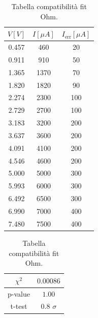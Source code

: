 \documentclass[letterpaper,12pt]{article}
\begin{document}
\begin{table}[h!]
    \begin{subtable}{0.5\textwidth}
        \centering
        \begin{tabular}{ccc}
            \toprule
            \rowcolor{blue!10}
            \textbf{$V[V]$} & \textbf{$I[\mu A]$} & \textbf{$I_{\text{err}}[\mu A]$} \\
            \midrule
            0.457 & 460 & 20 \\
            0.911 & 910 & 50 \\
            1.365 & 1370 & 70 \\
            1.820 & 1820 & 90 \\
            2.274 & 2300 & 100 \\
            2.729 & 2700 & 100 \\
            3.183 & 3200 & 200 \\
            3.637 & 3600 & 200 \\
            4.091 & 4100 & 200 \\
            4.546 & 4600 & 200 \\
            5.000 & 5000 & 300 \\
            5.993 & 6000 & 300 \\
            6.492 & 6500 & 300 \\
            6.990 & 7000 & 400 \\
            7.480 & 7500 & 400 \\
            \bottomrule
        \end{tabular}
        \captionsetup{position=bottom}
        \caption{Misure legge di Ohm}
        \label{tab:Misure legge Ohm}
    \end{subtable}%
    \begin{subtable}{0.5\textwidth}
        \centering
        \begin{tabular}{c|c}
            \hline
            \cellcolor{blue!10}$\chi^2$ & $0.00086$ \\ \hline
            \cellcolor{blue!10}p-value & $1.00$ \\ \hline
            \cellcolor{blue!10}t-test& $0.8$ $\sigma$ \\
            \hline
        \end{tabular}
        \caption{Tabella compatibilità fit Ohm.}
        \label{tab:Tab_compatib_ohm}
    \end{subtable}
\end{table} 
\end{document}
